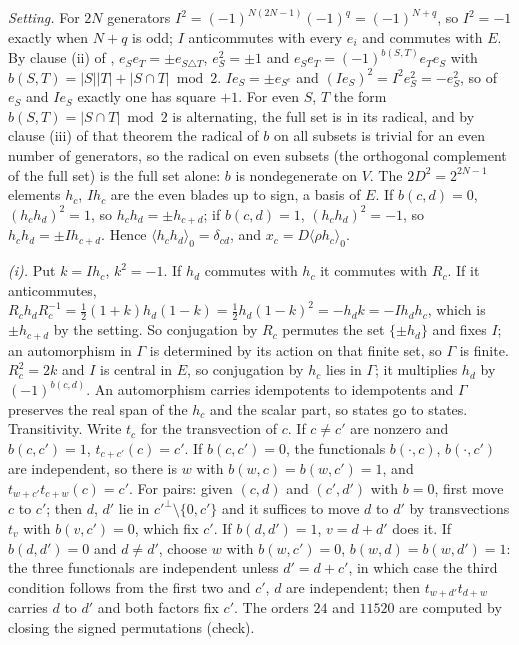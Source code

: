 \emph{Setting.} For $2N$ generators $I^{2} = (-1)^{N(2N-1)}(-1)^{q} = (-1)^{N+q}$, so $I^{2} = -1$ exactly when $N + q$ is odd; $I$ anticommutes with every $e_{i}$ and commutes with $E$. By clause (ii) of , $e_{S}e_{T} = \pm e_{S\triangle T}$, $e_{S}^{2} = \pm 1$ and $e_{S}e_{T} = (-1)^{b(S,T)}e_{T}e_{S}$ with $b(S,T) = |S||T| + |S\cap T| \bmod 2$. $Ie_{S} = \pm e_{S^{c}}$ and $(Ie_{S})^{2} = I^{2}e_{S}^{2} = -e_{S}^{2}$, so of $e_{S}$ and $Ie_{S}$ exactly one has square $+1$. For even $S$, $T$ the form $b(S,T) = |S\cap T| \bmod 2$ is alternating, the full set is in its radical, and by clause (iii) of that theorem the radical of $b$ on all subsets is trivial for an even number of generators, so the radical on even subsets (the orthogonal complement of the full set) is the full set alone: $b$ is nondegenerate on $V$. The $2D^{2} = 2^{2N-1}$ elements $h_{c}$, $Ih_{c}$ are the even blades up to sign, a basis of $E$. If $b(c,d) = 0$, $(h_{c}h_{d})^{2} = 1$, so $h_{c}h_{d} = \pm h_{c+d}$; if $b(c,d) = 1$, $(h_{c}h_{d})^{2} = -1$, so $h_{c}h_{d} = \pm Ih_{c+d}$. Hence $\langle h_{c}h_{d}\rangle_{0} = \delta_{cd}$, and $x_{c} = D\langle\rho h_{c}\rangle_{0}$.

\emph{(i).} Put $k = Ih_{c}$, $k^{2} = -1$. If $h_{d}$ commutes with $h_{c}$ it commutes with $R_{c}$. If it anticommutes, $R_{c}h_{d}R_{c}^{-1} = \tfrac12(1 + k)h_{d}(1 - k) = \tfrac12 h_{d}(1 - k)^{2} = -h_{d}k = -Ih_{d}h_{c}$, which is $\pm h_{c+d}$ by the setting. So conjugation by $R_{c}$ permutes the set $\{\pm h_{d}\}$ and fixes $I$; an automorphism in $\Gamma$ is determined by its action on that finite set, so $\Gamma$ is finite. $R_{c}^{2} = 2k$ and $I$ is central in $E$, so conjugation by $h_{c}$ lies in $\Gamma$; it multiplies $h_{d}$ by $(-1)^{b(c,d)}$. An automorphism carries idempotents to idempotents and $\Gamma$ preserves the real span of the $h_{c}$ and the scalar part, so states go to states. Transitivity. Write $t_{c}$ for the transvection of $c$. If $c \ne c'$ are nonzero and $b(c,c') = 1$, $t_{c+c'}(c) = c'$. If $b(c,c') = 0$, the functionals $b(\cdot,c)$, $b(\cdot,c')$ are independent, so there is $w$ with $b(w,c) = b(w,c') = 1$, and $t_{w+c'}t_{c+w}(c) = c'$. For pairs: given $(c,d)$ and $(c',d')$ with $b = 0$, first move $c$ to $c'$; then $d$, $d'$ lie in $c'^{\perp}\setminus\{0, c'\}$ and it suffices to move $d$ to $d'$ by transvections $t_{v}$ with $b(v,c') = 0$, which fix $c'$. If $b(d,d') = 1$, $v = d + d'$ does it. If $b(d,d') = 0$ and $d \ne d'$, choose $w$ with $b(w,c') = 0$, $b(w,d) = b(w,d') = 1$: the three functionals are independent unless $d' = d + c'$, in which case the third condition follows from the first two and $c'$, $d$ are independent; then $t_{w+d'}t_{d+w}$ carries $d$ to $d'$ and both factors fix $c'$. The orders $24$ and $11520$ are computed by closing the signed permutations (check).

